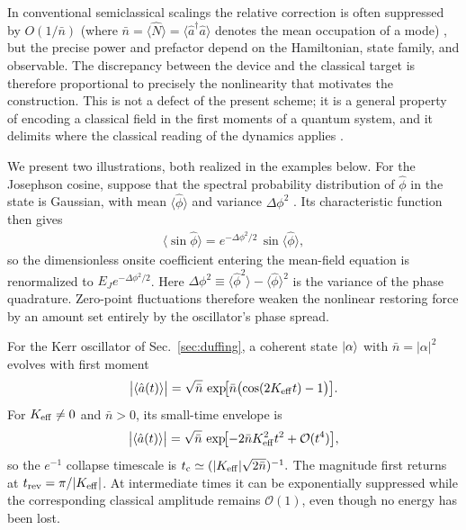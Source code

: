 \documentclass[pra,twocolumn,superscriptaddress,nofootinbib,floatfix]{revtex4-2}
\theoremstyle{remark}
\newcommand{\revcolor}{\color{blue}}
\DeclareRobustCommand{\rev}[1]{{\revcolor #1}}
\begin{document}
\rev{In conventional semiclassical scalings the relative correction is often suppressed by $O(1/\bar n)$ (where $\bar n = \langle \hat N \rangle =\langle\hat a^\dagger\hat a\rangle$ denotes the mean occupation of a mode) \cite{Polkovnikov_2010}, but the precise power and prefactor depend on the Hamiltonian, state family, and observable.} The discrepancy between the device and the classical target is therefore proportional to precisely the nonlinearity that motivates the construction. This is not a defect of the present scheme; it is a general property of encoding a classical field in the first moments of a quantum system, and it delimits where the classical reading of the dynamics applies \cite{Ballentine_1994}.

We present two illustrations, both realized in the examples below. For the Josephson cosine, suppose that the spectral probability distribution of \(\hat\phi\) in the state is Gaussian, with mean \(\langle\hat\phi\rangle\) and variance \(\Delta\phi^2\) \cite{Adesso_2014}. Its characteristic function then gives
\begin{align}
\bigl\langle \sin\hat\phi\bigr\rangle=e^{-\Delta\phi^2/2}\,\sin\bigl\langle\hat\phi\bigr\rangle,
\label{eq:debye-waller}
\end{align}
so the dimensionless onsite coefficient entering the mean-field equation is renormalized to $E_J e^{-\Delta\phi^2/2}$. Here \(\Delta\phi^2 \equiv \bigl\langle\hat\phi^2\bigr\rangle- \bigl\langle\hat\phi\bigr\rangle^2\) is the variance of the phase quadrature. Zero-point fluctuations therefore weaken the nonlinear restoring force by an amount set entirely by the oscillator's phase spread.

\rev{For the Kerr oscillator of Sec.~\ref{sec:duffing}, a coherent state \(\ket{\alpha}\) with \(\bar n=|\alpha|^2\) evolves with first moment \cite{Milburn1986,YurkeStoler1986}}
\[
\bigl|\langle\hat a(t)\rangle\bigr|  = \sqrt{\bar n}\, \exp\!\bigl[ \bar n\bigl(\cos(2K_{\rm eff}t)-1\bigr) \bigr].
\]
For \(K_{\rm eff}\neq0\) and \(\bar n>0\), its small-time envelope is
\[
\bigl|\langle\hat a(t)\rangle\bigr| = \sqrt{\bar n}\, \exp\!\bigl[ -2\bar n K_{\rm eff}^2t^2+\mathcal O(t^4)\bigr],
\]
so the \(e^{-1}\) collapse timescale is \(t_{\rm c}\simeq (|K_{\rm eff}|\sqrt{2\bar n})^{-1}.\) The magnitude first returns at \(t_{\rm rev}=\pi/|K_{\rm eff}|\). At intermediate times it can be exponentially suppressed while the corresponding classical amplitude remains \(\mathcal O(1)\), even though no energy has been lost.
\end{document}
